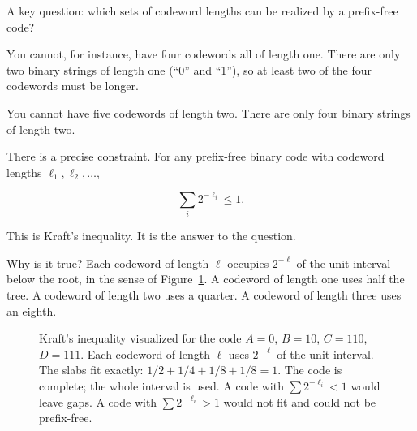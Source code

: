 A key question: which sets of codeword lengths can be realized by a prefix-free code?

You cannot, for instance, have four codewords all of length one. There are only two binary strings of length one (``0'' and ``1''), so at least two of the four codewords must be longer.

You cannot have five codewords of length two. There are only four binary strings of length two.

There is a precise constraint. For any prefix-free binary code with codeword lengths $\ell_1, \ell_2, \ldots$,

$$\sum_i 2^{-\ell_i} \leq 1.$$

This is Kraft's inequality. It is the answer to the question.

Why is it true? Each codeword of length $\ell$ occupies $2^{-\ell}$ of the unit interval below the root, in the sense of Figure~\ref{fig:kraft}. A codeword of length one uses half the tree. A codeword of length two uses a quarter. A codeword of length three uses an eighth.

\begin{figure}[h]
\centering
{}
\caption{Kraft's inequality visualized for the code $A=0$, $B=10$, $C=110$, $D=111$. Each codeword of length $\ell$ uses $2^{-\ell}$ of the unit interval. The slabs fit exactly: $1/2 + 1/4 + 1/8 + 1/8 = 1$. The code is complete; the whole interval is used. A code with $\sum 2^{-\ell_i} < 1$ would leave gaps. A code with $\sum 2^{-\ell_i} > 1$ would not fit and could not be prefix-free.}
\label{fig:kraft}
\end{figure}

